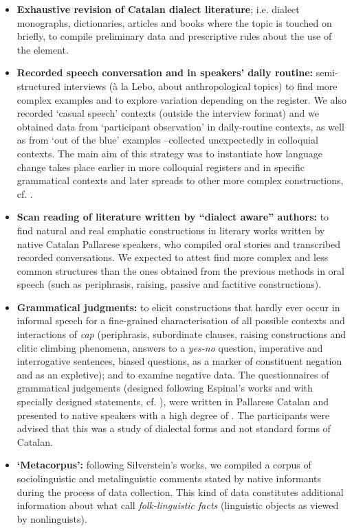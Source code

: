 \documentclass[output=paper]{LSP/langsci}
\begin{document}
\begin{itemize}
\item \textbf{Exhaustive revision of Catalan dialect literature}; i.e. dialect monographs, dictionaries, articles and books where the topic is touched on briefly, to compile preliminary data and prescriptive rules about the use of the element.
\item \textbf{Recorded speech conversation and  in speakers’ daily routine: }semi-structured interviews\textbf{ }(à la Lebo, about anthropological topics) to find more complex examples and to explore variation depending on the register. We also recorded ‘casual speech’ contexts (outside the interview format) and we obtained data from ‘participant observation’ in daily-routine contexts, as well as from ‘out of the blue’ examples –collected unexpectedly in colloquial contexts. The main aim of this strategy was to instantiate how language change takes place earlier in more colloquial registers and in specific grammatical contexts and later spreads to other more complex constructions, cf. \citet[§3.4]{roberts_diachronic_2007}.
\item \textbf{Scan reading of literature written by “dialect aware” authors: }to find natural and real emphatic constructions in literary works written by native Catalan Pallarese speakers, who compiled oral stories and transcribed recorded conversations. We expected to attest find more complex and less common structures than the ones obtained from the previous methods in oral speech (such as periphrasis, raising, passive and factitive constructions). 
\item \textbf{Grammatical judgments:} to elicit constructions that hardly ever occur in informal speech for a fine-grained characterisation of all possible contexts and interactions of \textit{cap} (periphrasis, subordinate clauses, raising constructions and clitic climbing phenomena, answers to a \textit{yes-no} question, imperative and interrogative sentences, biased questions, as a marker of constituent negation and as an expletive); and to examine negative data. The questionnaires of grammatical judgements (designed following Espinal’s works and with specially designed statements, cf. \citealt{espinal_two_1993,espinal_negacio_2002}), were written in Pallarese Catalan and presented to native speakers with a high degree of . The participants were advised that this was a study of dialectal forms and not standard forms of Catalan. 
\item {}\textbf{`Metacorpus': }following Silverstein’s works, we compiled a corpus of sociolinguistic and metalinguistic comments stated by native informants during the process of data collection. This kind of data constitutes additional information about what \citet{niedzielski_folk_1999} call \textit{folk-linguistic facts} (linguistic objects as viewed by nonlinguists).
\end{itemize}
\end{document}
